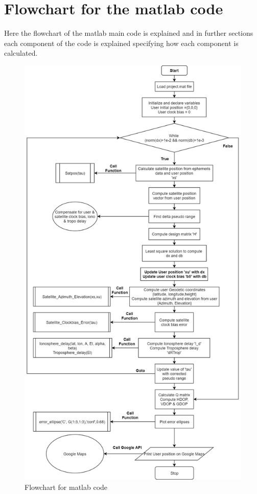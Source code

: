 \documentclass[conference,compsoc]{IEEEtran}
\begin{document}
\section{Flowchart for the matlab code}
Here the flowchart of the matlab main code is explained and in further sections each component of the code is explained specifying how each component is calculated.

\begin{figure}[!h]
	\centering
	\includegraphics[scale = 0.25]{images/flowchart.jpg}
	\caption{Flowchart for matlab code}
\end{figure}
\end{document}
